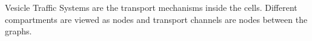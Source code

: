 Vesicle Traffic Systems are the transport mechanisms inside the cells.
%
Different compartments are viewed as nodes and transport channels are
nodes between the graphs.


